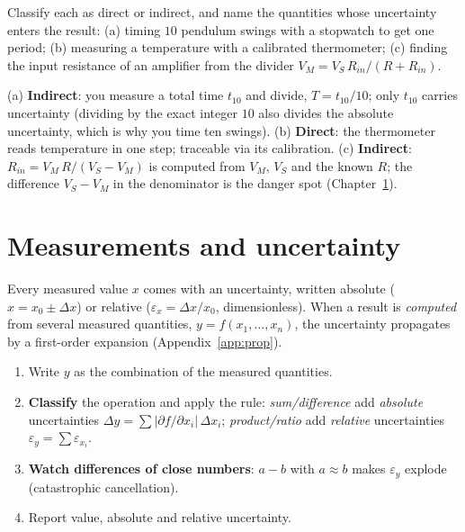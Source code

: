 \documentclass[11pt,a4paper,oneside]{book}
\begin{document}
\begin{exercise}
Classify each as direct or indirect, and name the quantities whose uncertainty
enters the result: (a) timing $10$ pendulum swings with a stopwatch to get one
period; (b) measuring a temperature with a calibrated thermometer; (c) finding the
input resistance of an amplifier from the divider
$V_M=V_S\,R_{in}/(R+R_{in})$.
\end{exercise}
\begin{solution}
(a) \textbf{Indirect}: you measure a total time $t_{10}$ and divide,
$T=t_{10}/10$; only $t_{10}$ carries uncertainty (dividing by the exact integer
$10$ also divides the absolute uncertainty, which is why you time ten swings).
(b) \textbf{Direct}: the thermometer reads temperature in one step; traceable via
its calibration. (c) \textbf{Indirect}:
$R_{in}=V_M\,R/(V_S-V_M)$ is computed from $V_M$, $V_S$ and the known $R$; the
difference $V_S-V_M$ in the denominator is the danger spot
(Chapter~\ref{ch:uncert}).
\end{solution}

\chapter{Measurements and uncertainty}\label{ch:uncert}

Every measured value $x$ comes with an uncertainty, written absolute
($x=x_0\pm\Delta x$) or relative ($\varepsilon_x=\Delta x/x_0$, dimensionless).
When a result is \emph{computed} from several measured quantities,
$y=f(x_1,\dots,x_n)$, the uncertainty propagates by a first-order expansion
(Appendix~\ref{app:prop}).

\begin{protocol}[Propagate uncertainty through $y=f(x_1,\dots,x_n)$]
\begin{enumerate}[leftmargin=1.5cm]
  \item Write $y$ as the combination of the measured quantities.
  \item \textbf{Classify} the operation and apply the rule:
        \emph{sum/difference} add \emph{absolute} uncertainties
        $\Delta y=\sum|\partial f/\partial x_i|\,\Delta x_i$;
        \emph{product/ratio} add \emph{relative} uncertainties
        $\varepsilon_y=\sum\varepsilon_{x_i}$.
  \item \textbf{Watch differences of close numbers}: $a-b$ with $a\approx b$
        makes $\varepsilon_y$ explode (catastrophic cancellation).
  \item Report value, absolute and relative uncertainty.
\end{enumerate}
\end{protocol}
\end{document}
